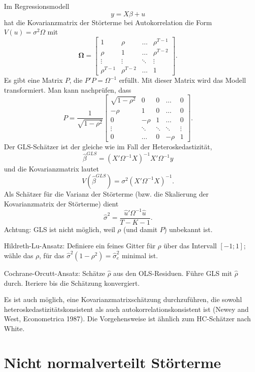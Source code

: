 \documentclass{article}
\begin{document}
Im Regressionsmodell
\[ y=X\beta+u \]
hat die Kovarianzmatrix der Störterme bei Autokorrelation die Form
$V(u)=\sigma^2\Omega$ mit
\[ \mathbf{\Omega }=\left[ 
\begin{array}{cccc}
1 & \rho & \ldots & \rho ^{T-1} \\ 
\rho & 1 & \ldots & \rho ^{T-2} \\ 
\vdots & \vdots & \ddots & \vdots \\ 
\rho ^{T-1} & \rho ^{T-2} & \ldots & 1%
\end{array} \right]. \]
Es gibt eine Matrix $P$, die $P'P=\Omega^{-1}$ erfüllt. Mit dieser
Matrix wird das Modell transformiert. Man kann nachprüfen, dass
\[ P=\frac{1}{\sqrt{1-\rho ^{2}}}\left[ 
\begin{array}{ccccc}
\sqrt{1-\rho ^{2}} & 0 & 0 & \ldots & 0 \\ 
-\rho & 1 & 0 & \ldots & 0 \\ 
0 & -\rho & 1 & \ldots & 0 \\ 
\vdots & \ddots & \ddots & \ddots & \vdots \\ 
0 & \ldots & 0 & -\rho & 1%
\end{array}\right]. \]
Der GLS-Schätzer ist der gleiche wie im Fall der Heteroskedastizität,
\[ \hat{\beta}^{GLS}=(X'\Omega^{-1}X)^{-1}X'\Omega^{-1}y \]
und die Kovarianzmatrix lautet
\[ V(\hat{\beta}^{GLS})=\sigma ^{2}(X'\Omega^{-1}X)^{-1}. \]
Als Schätzer für die Varianz der Störterme (bzw. die Skalierung der
Kovarianzmatrix der Störterme) dient
\[ \hat{\sigma}^{2}=\frac{\hat{u}'\Omega^{-1}\hat{u}}{T-K-1}. \]
Achtung: GLS ist nicht möglich, weil $\rho$ (und damit $P$) unbekannt ist.

Hildreth-Lu-Ansatz: Definiere ein feines Gitter für $\rho $ über das Intervall 
$[-1;1]$; wähle das $\rho $, für das $\hat{\sigma}^{2}(1-\rho^2)=\hat{\sigma}_e^2$ minimal ist.

Cochrane-Orcutt-Ansatz: Schätze $\hat{\rho}$ aus den OLS-Residuen.
Führe GLS mit $\hat{\rho}$ durch. Iteriere bis die Schätzung konvergiert.

Es ist auch möglich, eine Kovarianzmatrixschätzung durchzuführen, die sowohl heteroskedastizitätskonsistent
als auch autokorrelationskonsistent ist (Newey and West, Econometrica 1987). Die 
Vorgehensweise ist ähnlich zum HC-Schätzer nach White.

\section{Nicht normalverteilt Störterme}
\end{document}
